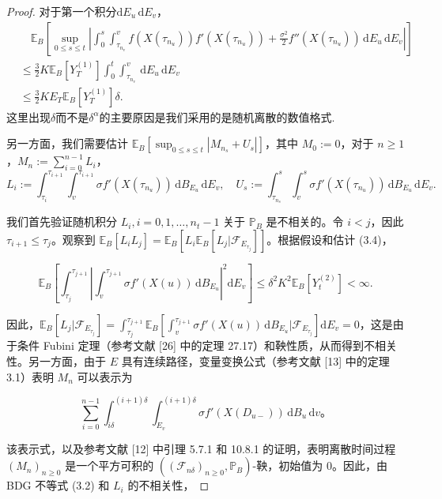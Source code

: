 \begin{proof}
	对于第一个积分$ \mathrm{d}E_{u} \, \mathrm{d}E_{v}$，
	\begin{align}
		& \quad \mathbb{E}_B \left[\sup_{0 \leq s \leq t} \left| \int_0^s \int_{\tau_{n_v}}^{v} f(X(\tau_{n_{u}}))f'(X(\tau_{n_{u}}))  + \frac{\sigma^2}{2} f''(X(\tau_{n_{u}})) \, \mathrm{d}E_{u} \, \mathrm{d}E_{v} \right|\right] \nonumber \\
		&\leq  \frac{3}{2}K \mathbb{E}_B[Y_T^{(1)}] \int_0^t \int_{\tau_{n_{v}}}^{v} \, \mathrm{d}E_{u} \, \mathrm{d}E_{v} \nonumber \\
		&\leq  \frac{3}{2}K E_T \mathbb{E}_B[Y_T^{(1)}] \delta.  \label{II21}
	\end{align}
	这里出现$\delta$而不是$\delta^{\alpha}$的主要原因是我们采用的是随机离散的数值格式.
	
	另一方面，我们需要估计 $\mathbb{E}_B \left[\sup_{0 \leq s \leq t} |M_{n_s} + U_s|\right]$，其中 $M_0 := 0$，对于 $n \geq 1$，$M_n := \sum_{i=0}^{n-1} L_i$，
	$$
	L_i := \int_{\tau_i}^{\tau_{i+1}} \int_v^{\tau_{i+1}} \sigma f'(X(\tau_{n_{u}})) \, \mathrm{d}B_{E_{u}} \, \mathrm{d}E_{v}, \quad U_s := \int_{\tau_{n_s}}^s \int_v^{s} \sigma f'(X(\tau_{n_{u}})) \, \mathrm{d}B_{E_{u}} \, \mathrm{d}E_{v}.
	$$
	
	我们首先验证随机积分 $L_i, i=0,1,\ldots,n_t-1$ 关于 $\mathbb{P}_B$ 是不相关的。令 $i < j$，因此 $\tau_{i+1} \leq \tau_j$。观察到 $\mathbb{E}_B [L_i L_j] = \mathbb{E}_B \left[L_i \mathbb{E}_B [L_j | \mathcal{F}_{E_{\tau_j}}]\right]$。根据假设和估计 (3.4)，
	
	$$
	\mathbb{E}_B \left[\int_{\tau_j}^{\tau_{j+1}} \left|\int_{v}^{\tau_{j+1}} \sigma f'(X(u))\, \mathrm{d}B_{E_{u}}\right|^2 \mathrm{d}E_{v}\right] \leq \delta^2 K^2 \mathbb{E}_B [Y_t^{(2)}] < \infty.
	$$
	
	因此，$\mathbb{E}_B \left[L_j | \mathcal{F}_{E_{\tau_j}}\right] = \int_{\tau_j}^{\tau_{j+1}} \mathbb{E}_B \left[\int_{v}^{\tau_{j+1}} \sigma f'(X(u))  \, \mathrm{d}B_{E_{u}} | \mathcal{F}_{E_{\tau_j}}\right] \mathrm{d}E_{v} = 0$，这是由于条件 Fubini 定理（参考文献 [26] 中的定理 27.17）和鞅性质，从而得到不相关性。另一方面，由于 $E$ 具有连续路径，变量变换公式（参考文献 [13] 中的定理 3.1）表明 $M_n$ 可以表示为
	
	$$
	\sum_{i=0}^{n-1} \int_{i\delta}^{(i+1)\delta} \int_{E_{v}}^{(i+1)\delta} \sigma f'(X(D_{u-})) \, \mathrm{d}B_{u} \, \mathrm{d}v。
	$$
	
	该表示式，以及参考文献 [12] 中引理 5.7.1 和 10.8.1 的证明，表明离散时间过程 $(M_n)_{n \geq 0}$ 是一个平方可积的 $((\mathcal{F}_{n\delta})_{n \geq 0}, \mathbb{P}_B)$-鞅，初始值为 0。因此，由 BDG 不等式 (3.2) 和 $L_i$ 的不相关性，
	

\end{proof}

